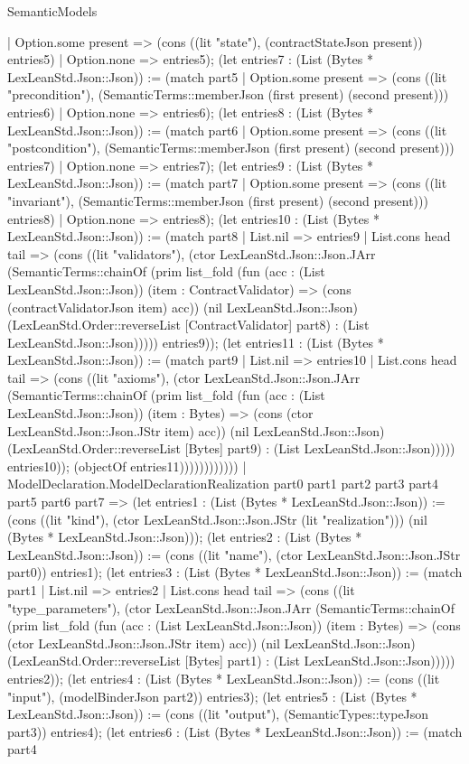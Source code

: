\begin{lexlean}{SemanticModels}
\begin{semanticmodule}
{      | Option.some present => (cons ((lit "state"), (contractStateJson present)) entries5)
      | Option.none => entries5); (let entries7 : (List (Bytes * LexLeanStd.Json::Json)) := (match part5
      | Option.some present => (cons ((lit "precondition"), (SemanticTerms::memberJson (first present) (second present))) entries6)
      | Option.none => entries6); (let entries8 : (List (Bytes * LexLeanStd.Json::Json)) := (match part6
      | Option.some present => (cons ((lit "postcondition"), (SemanticTerms::memberJson (first present) (second present))) entries7)
      | Option.none => entries7); (let entries9 : (List (Bytes * LexLeanStd.Json::Json)) := (match part7
      | Option.some present => (cons ((lit "invariant"), (SemanticTerms::memberJson (first present) (second present))) entries8)
      | Option.none => entries8); (let entries10 : (List (Bytes * LexLeanStd.Json::Json)) := (match part8
      | List.nil => entries9
      | List.cons head tail => (cons ((lit "validators"), (ctor LexLeanStd.Json::Json.JArr (SemanticTerms::chainOf (prim list_fold (fun (acc : (List LexLeanStd.Json::Json)) (item : ContractValidator) => (cons (contractValidatorJson item) acc)) (nil LexLeanStd.Json::Json) (LexLeanStd.Order::reverseList [ContractValidator] part8) : (List LexLeanStd.Json::Json))))) entries9)); (let entries11 : (List (Bytes * LexLeanStd.Json::Json)) := (match part9
      | List.nil => entries10
      | List.cons head tail => (cons ((lit "axioms"), (ctor LexLeanStd.Json::Json.JArr (SemanticTerms::chainOf (prim list_fold (fun (acc : (List LexLeanStd.Json::Json)) (item : Bytes) => (cons (ctor LexLeanStd.Json::Json.JStr item) acc)) (nil LexLeanStd.Json::Json) (LexLeanStd.Order::reverseList [Bytes] part9) : (List LexLeanStd.Json::Json))))) entries10)); (objectOf entries11))))))))))))
    | ModelDeclaration.ModelDeclarationRealization part0 part1 part2 part3 part4 part5 part6 part7 => (let entries1 : (List (Bytes * LexLeanStd.Json::Json)) := (cons ((lit "kind"), (ctor LexLeanStd.Json::Json.JStr (lit "realization"))) (nil (Bytes * LexLeanStd.Json::Json))); (let entries2 : (List (Bytes * LexLeanStd.Json::Json)) := (cons ((lit "name"), (ctor LexLeanStd.Json::Json.JStr part0)) entries1); (let entries3 : (List (Bytes * LexLeanStd.Json::Json)) := (match part1
      | List.nil => entries2
      | List.cons head tail => (cons ((lit "type_parameters"), (ctor LexLeanStd.Json::Json.JArr (SemanticTerms::chainOf (prim list_fold (fun (acc : (List LexLeanStd.Json::Json)) (item : Bytes) => (cons (ctor LexLeanStd.Json::Json.JStr item) acc)) (nil LexLeanStd.Json::Json) (LexLeanStd.Order::reverseList [Bytes] part1) : (List LexLeanStd.Json::Json))))) entries2)); (let entries4 : (List (Bytes * LexLeanStd.Json::Json)) := (cons ((lit "input"), (modelBinderJson part2)) entries3); (let entries5 : (List (Bytes * LexLeanStd.Json::Json)) := (cons ((lit "output"), (SemanticTypes::typeJson part3)) entries4); (let entries6 : (List (Bytes * LexLeanStd.Json::Json)) := (match part4
}
\end{semanticmodule}
\end{lexlean}
